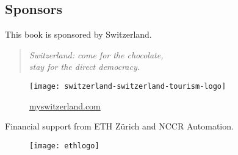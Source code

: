 
\vfill
\subsection{Sponsors}

This book is sponsored by Switzerland.

\begin{quote}\centering
    \itshape
    Switzerland: come for the chocolate,\\
    stay for the direct democracy.
\end{quote}

\begin{figure}[h]
    \centering
    \texttt{[image: switzerland-switzerland-tourism-logo]}

    \href{http://myswitzerland.com}{myswitzerland.com}
\end{figure}


Financial support from ETH Zürich and NCCR Automation.
\begin{figure}[h]
    \centering
    \texttt{[image: ethlogo]}
\end{figure}

\vfill